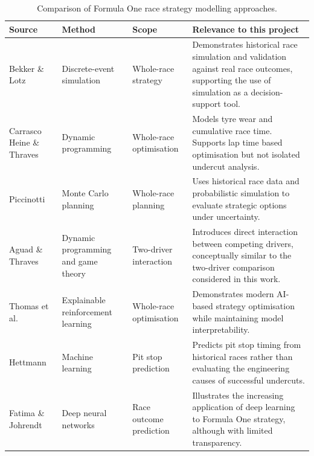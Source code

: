 \begin{table}[htbp]
\centering
\caption{Comparison of Formula One race strategy modelling approaches.}
\label{tab:existing_research}

\small
\renewcommand{\arraystretch}{1.25}

\begin{tabularx}{\textwidth}{|
>{\raggedright\arraybackslash}p{}|
>{\raggedright\arraybackslash}p{}|
>{\raggedright\arraybackslash}p{}|
X|
}
\hline
\textbf{Source}
&
\textbf{Method}
&
\textbf{Scope}
&
\textbf{Relevance to this project}
\\
\hline

Bekker \& Lotz
\cite{BekkerLotz2009}
&
Discrete-event simulation
&
Whole-race strategy
&
Demonstrates historical race simulation and validation against real race outcomes, supporting the use of simulation as a decision-support tool.
\\
\hline

Carrasco Heine \& Thraves
\cite{CarrascoHeineThraves2023}
&
Dynamic programming
&
Whole-race optimisation
&
Models tyre wear and cumulative race time. Supports lap time based optimisation but not isolated undercut analysis.
\\
\hline

Piccinotti
\cite{Piccinotti2021}
&
Monte Carlo planning
&
Whole-race planning
&
Uses historical race data and probabilistic simulation to evaluate strategic options under uncertainty.
\\
\hline

Aguad \& Thraves
\cite{AguadThraves2024}
&
Dynamic programming and game theory
&
Two-driver interaction
&
Introduces direct interaction between competing drivers, conceptually similar to the two-driver comparison considered in this work.
\\
\hline

Thomas et al.
\cite{ThomasEtAl2025}
&
Explainable reinforcement learning
&
Whole-race optimisation
&
Demonstrates modern AI-based strategy optimisation while maintaining model interpretability.
\\
\hline

Hettmann
\cite{Hettmann2024}
&
Machine learning
&
Pit stop prediction
&
Predicts pit stop timing from historical races rather than evaluating the engineering causes of successful undercuts.
\\
\hline

Fatima \& Johrendt
\cite{FatimaJohrendt2023}
&
Deep neural networks
&
Race outcome prediction
&
Illustrates the increasing application of deep learning to Formula One strategy, although with limited transparency.
\\
\hline

\end{tabularx}

\end{table}